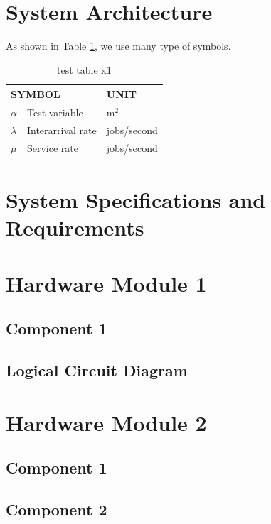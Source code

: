 \documentclass[12pt,oneside,openright,a4paper]{explo-english-project}
\begin{document}
\section{System Architecture}
As shown in Table \ref{tbl:symbols}, we use many type of symbols.

\begin{table}[!h]
\centering
\caption{test table x1}\label{tbl:symbols}
\begin{tabular}{@{}p{}|p{}p{}}\hline
\multicolumn{2}{l}{\textbf{SYMBOL}}  & \textbf{UNIT} \\ \hline 
$\alpha$ & Test variable\hfill & m$^2$ \\
$\lambda$ & Interarrival rate\hfill &  jobs/second\\
$\mu$ & Service rate\hfill & jobs/second \\ \hline
\end{tabular}
\end{table}

\section{System Specifications and Requirements}

\section{Hardware Module 1}
\subsection{Component 1}
\subsection{Logical Circuit Diagram}

\section{Hardware Module 2}
\subsection{Component 1}
\subsection{Component 2}
\end{document}
